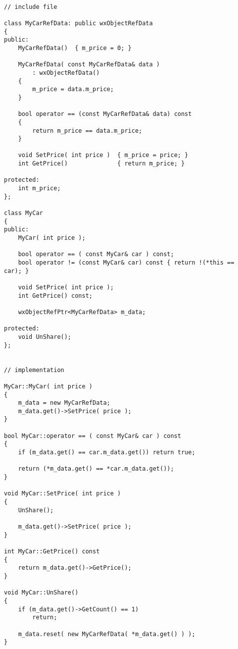 \begin{verbatim}

// include file

class MyCarRefData: public wxObjectRefData
{
public:
    MyCarRefData()  { m_price = 0; }
    
    MyCarRefData( const MyCarRefData& data )
        : wxObjectRefData()
    {
        m_price = data.m_price;
    }

    bool operator == (const MyCarRefData& data) const
    {
        return m_price == data.m_price;
    }
    
    void SetPrice( int price )  { m_price = price; }
    int GetPrice()              { return m_price; }
    
protected:
    int m_price;
};

class MyCar
{
public:
    MyCar( int price );
    
    bool operator == ( const MyCar& car ) const;
    bool operator != (const MyCar& car) const { return !(*this == car); }

    void SetPrice( int price );
    int GetPrice() const;

    wxObjectRefPtr<MyCarRefData> m_data;
    
protected:
    void UnShare();
};


// implementation

MyCar::MyCar( int price )
{
    m_data = new MyCarRefData;
    m_data.get()->SetPrice( price );
}

bool MyCar::operator == ( const MyCar& car ) const
{
    if (m_data.get() == car.m_data.get()) return true;

    return (*m_data.get() == *car.m_data.get());
}

void MyCar::SetPrice( int price )
{
    UnShare();
        
    m_data.get()->SetPrice( price );
}

int MyCar::GetPrice() const
{
    return m_data.get()->GetPrice();
}

void MyCar::UnShare()
{
    if (m_data.get()->GetCount() == 1)
        return;
    
    m_data.reset( new MyCarRefData( *m_data.get() ) );
}

\end{verbatim}



\label{wxobjectdataptrwxobjectdataptr}

